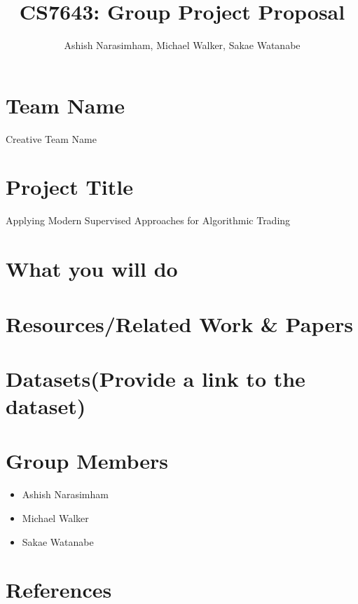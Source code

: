 \documentclass[
	letterpaper, %
]{jdf}
\author{Ashish Narasimham, Michael Walker, Sakae Watanabe}
\title{CS7643: Group Project Proposal}
\begin{document}
\maketitle

\section*{Team Name}

Creative Team Name

\section*{Project Title}

Applying Modern Supervised Approaches for Algorithmic Trading

\section*{What you will do}

\section*{Resources/Related Work \& Papers}

\section*{Datasets(Provide a link to the dataset)}

\section*{Group Members}

\begin{itemize}
	\item Ashish Narasimham
	\item Michael Walker
	\item Sakae Watanabe
\end{itemize}

\section{References}

\printbibliography[heading=none]
\end{document}
